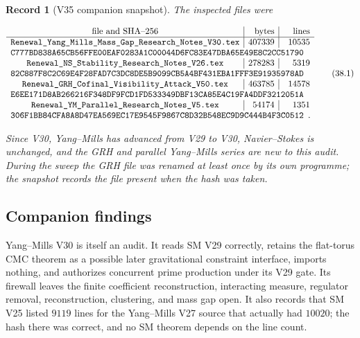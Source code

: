 \documentclass[11pt]{article}
\newtheorem{record}[theorem]{Record}
\theoremstyle{remark}
\begin{document}
\begin{record}[V35 companion snapshot]
\label{rec:v19v35-snapshot}
The inspected files were

\[
\begin{array}{c|r|r}
\hbox{file and SHA--256}&\hbox{bytes}&\hbox{lines}\\ \hline
\texttt{Renewal\_Yang\_Mills\_Mass\_Gap\_Research\_Notes\_V30.tex}
&407339&10535\\
\multicolumn{3}{l}{
\texttt{C777BD838A65CB56FFE00EAF0283A1C00044D6FC83E47DBA65E49E8C2CC51790}}
\\
\texttt{Renewal\_NS\_Stability\_Research\_Notes\_V26.tex}
&278283&5319\\
\multicolumn{3}{l}{
\texttt{82C887F8C2C69E4F28FAD7C3DC8DE5B9099CB5A4BF431EBA1FFF3E91935978AD}}
\\
\texttt{Renewal\_GRH\_Cofinal\_Visibility\_Attack\_V50.tex}
&463785&14578\\
\multicolumn{3}{l}{
\texttt{E6EE171D8AB266216F348DF9FCD1FD533349DBF13CA85E4C19FA4DDF3212051A}}
\\
\texttt{Renewal\_YM\_Parallel\_Research\_Notes\_V5.tex}
&54174&1351\\
\multicolumn{3}{l}{
\texttt{306F1BB84CFA8A8D47EA569EC17E9545F9867C8D32B548EC9D9C444B4F3C0512}}.
\end{array}                                                     \tag{38.1}
\]

Since V30, Yang--Mills has advanced from V29 to V30, Navier--Stokes is
unchanged, and the GRH and parallel Yang--Mills series are new to this
audit.  During the sweep the GRH file was renamed at least once by its
own programme; the snapshot records the file present when the hash was
taken.
\end{record}

\subsection{Companion findings}

Yang--Mills V30 is itself an audit.  It reads SM V29 correctly, retains
the flat-torus CMC theorem as a possible later gravitational constraint
interface, imports nothing, and authorizes concurrent prime production
under its V29 gate.  Its firewall leaves the finite coefficient
reconstruction, interacting measure, regulator removal, reconstruction,
clustering, and mass gap open.  It also records that SM V25 listed
\(9119\) lines for the Yang--Mills V27 source that actually had
\(10020\); the hash there was correct, and no SM theorem depends on the
line count.
\end{document}
